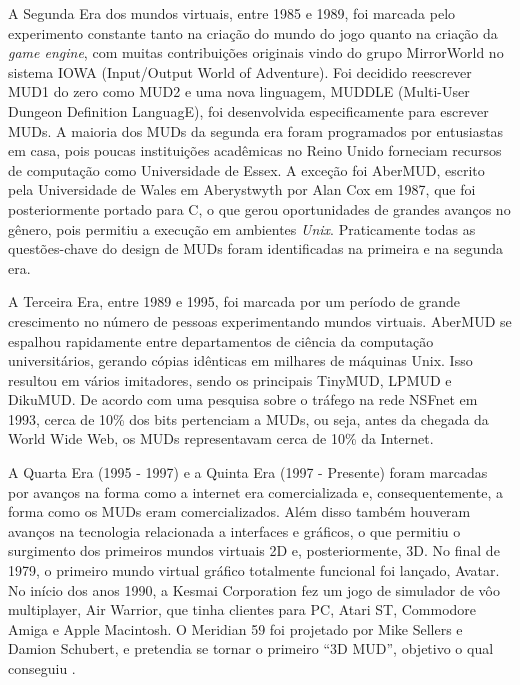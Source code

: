 A Segunda Era dos mundos virtuais, entre 1985 e 1989, foi marcada pelo experimento constante tanto na 
criação do mundo do jogo quanto na criação da \textit{game engine}, com muitas contribuições originais 
vindo do grupo MirrorWorld no sistema IOWA (Input/Output World of Adventure). Foi decidido reescrever 
MUD1 do zero como MUD2 e uma nova linguagem, MUDDLE (Multi-User Dungeon Definition LanguagE), foi desenvolvida 
especificamente para escrever MUDs. A maioria dos MUDs da segunda era foram programados por entusiastas 
em casa, pois poucas instituições acadêmicas no Reino Unido forneciam recursos de computação como 
Universidade de Essex. A exceção foi AberMUD, escrito pela Universidade de Wales em Aberystwyth por 
Alan Cox em 1987, que foi posteriormente portado para C, o que gerou oportunidades de grandes 
avanços no gênero, pois permitiu a execução em ambientes \textit{Unix}. Praticamente todas as 
questões-chave do design de MUDs foram identificadas na primeira e na segunda era.

A Terceira Era, entre 1989 e 1995, foi marcada por um período de grande crescimento no número de 
pessoas experimentando mundos virtuais. AberMUD se espalhou rapidamente entre departamentos de ciência 
da computação universitários, gerando cópias idênticas em milhares de máquinas Unix. Isso resultou em 
vários imitadores, sendo os principais TinyMUD, LPMUD e DikuMUD. De acordo com uma pesquisa sobre o 
tráfego na rede NSFnet em 1993, cerca de 10\% dos bits pertenciam a MUDs, ou seja, antes da chegada da 
World Wide Web, os MUDs representavam cerca de 10\% da Internet.

A Quarta Era (1995 - 1997) e a Quinta Era (1997 - Presente) foram marcadas por avanços na forma como a 
internet era comercializada e, consequentemente, a forma como os MUDs eram comercializados. Além disso 
também houveram avanços na tecnologia relacionada a interfaces e gráficos, o que permitiu o surgimento 
dos primeiros mundos virtuais 2D e, posteriormente, 3D. No final de 1979, o primeiro mundo virtual 
gráfico totalmente funcional foi lançado, Avatar. No início dos anos 1990, a Kesmai Corporation fez um jogo de simulador de vôo multiplayer, Air Warrior, 
que tinha clientes para PC, Atari ST, Commodore Amiga e Apple Macintosh. O Meridian 59 foi projetado por 
Mike Sellers e Damion Schubert, e pretendia se tornar o primeiro “3D MUD”, objetivo o qual conseguiu \cite{bartle2004designing}.